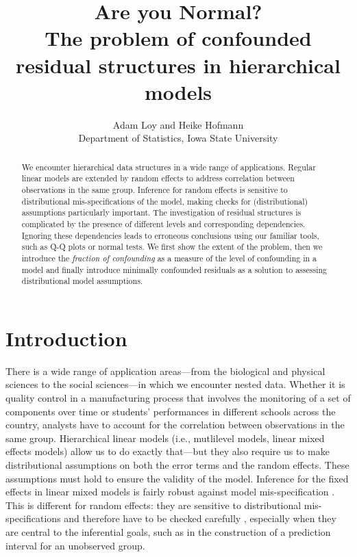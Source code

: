 \documentclass{article} %
\title{Are you Normal? \\ {\Large The problem of confounded residual structures in hierarchical models}}
\author{
	Adam Loy and Heike Hofmann\\
	Department of Statistics,
	Iowa State University
}
\newcommand{\al}[1]{{\color{red} #1}}
\begin{document}
\maketitle


\begin{abstract}
We encounter hierarchical data structures in a wide range of applications. Regular linear models are extended by random effects to address correlation between observations in the same group. Inference for random effects is sensitive to  distributional mis-specifications of the model, making checks for (distributional) assumptions particularly important.  The investigation of residual structures is complicated by the presence of  different levels and corresponding  dependencies. Ignoring these dependencies leads to  erroneous conclusions using our familiar tools, such as Q-Q plots or normal tests. We first show the extent of the problem, then we introduce the {\it fraction of confounding} as a measure of the level of confounding in a model and finally introduce minimally confounded residuals as a solution to assessing distributional model assumptions.
\end{abstract}


\section{Introduction}\label{sec:intro}
There is a wide range of application areas---from the biological and physical sciences to the social sciences---in which we encounter nested  data.
Whether it is quality control in a manufacturing process that involves the monitoring of a set of components over  time  or students' performances in different schools across the country, analysts have to account for  the correlation between observations in the same group.  Hierarchical linear models \al{(i.e., mutlilevel models, linear mixed effects models)} allow us to do exactly that---but they also require us to make distributional assumptions on both the error terms and the random effects. These assumptions must hold to ensure the validity of the model.  
Inference for the fixed effects in linear mixed models is fairly robust against model mis-specification \citep{Butler:1992tx, Verbeke:1997tf}. This is different for random effects: they are sensitive to  distributional mis-specifications and  therefore have to be checked carefully\al{, especially when they are central to the inferential goals, such as in the construction of a prediction interval for an unobserved group}.
\end{document}
